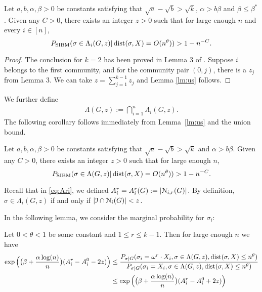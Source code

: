 \documentclass{article}
\begin{document}
\begin{lemma} \label{lm:us}
	Let $a,b,\alpha,\beta> 0$ be constants satisfying that $\sqrt{a}-\sqrt{b} > \sqrt{k}$, $\alpha>b\beta$ and $\beta\le \beta^\ast$.
	Given any $C>0$, there exists an integer $z>0$ such that for large enough $n$ and every $i\in[n]$, 
	\begin{equation} \label{eq:zr}
	P_{\operatorname{SIBM}} (\sigma\in \Lambda_i(G, z)
	| \operatorname{dist}(\sigma, X) = O(n^{\theta}))
	> 1 - n^{-C} .
	\end{equation}
\end{lemma}
\begin{proof}
	The conclusion for $k=2$ has been proved in Lemma 3 of \cite{ye2020exact}. Suppose $i$ belongs to the first community, and for the community
	pair $(0, j)$, there is a $z_{j}$ from Lemma 3.
	We can take $z = \sum_{j=1}^{k-1} z_j$ and Lemma \ref{lm:us} follows.
\end{proof}
We further define 
\begin{align*}
\Lambda(G, z) :=
\bigcap_{i=1}^n
\Lambda_i(G, z) .
\end{align*}
The following corollary follows immediately from Lemma~\ref{lm:us} and the union bound.
\begin{corollary} \label{cr:1}
	Let $a,b,\alpha,\beta> 0$ be constants satisfying that $\sqrt{a}-\sqrt{b} > \sqrt{k}$ and $\alpha>b\beta$.
	Given any $C>0$, there exists an integer $z>0$ such that for large enough $n$, 
	$$
	P_{\operatorname{SIBM}} (\sigma\in \Lambda(G, z)
	|  \operatorname{dist}(\sigma, X) = O(n^{\theta}))
	> 1 - n^{-C} .
	$$
\end{corollary}

Recall that in \eqref{eq:Ari}, we defined $A^r_i=A^r_i(G):=|\mathcal{N}_{i,r}(G)|$.
By definition, $\sigma \in  \Lambda_i(G,z)$ if and only if $|\mathcal{I}\cap \mathcal{N}_i(G)| < z$.

In the following lemma, we consider the marginal probability for $\sigma_i$:
\begin{lemma} \label{lm:et}
	Let $0<\theta<1$ be some constant and $1\leq r \leq k-1$. Then for large enough $n$ we have
	\begin{align*}
	\exp\Big(\big(\beta+\frac{\alpha\log(n)}{n} \big) (A^r_i-A^0_i - 2z) \Big) & \le 
	\frac{P_{\sigma|G}(\sigma_i= \omega^r \cdot X_i, \sigma\in \Lambda(G,z) ,\operatorname{dist}(\sigma, X) \le n^{\theta} ) } 
	{ P_{\sigma|G}(\sigma_i=X_i, \sigma\in \Lambda(G,z) ,\operatorname{dist}(\sigma, X) \le n^{\theta} ) } \\
	& \le \exp\Big(\big(\beta+\frac{\alpha\log(n)}{n} \big) (A^r_i-A^0_i + 2z) \Big)
	\end{align*}
\end{lemma}
\end{document}
